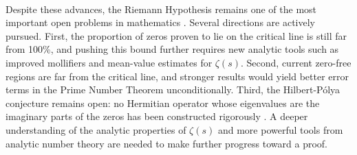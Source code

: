 \documentclass[10pt]{article}
\begin{document}
\paragraph{}
Despite these advances, the Riemann Hypothesis remains one of the most 
important open problems in mathematics \cite{carlson_millennium_2023}. 
Several directions are actively pursued. First, the proportion of zeros 
proven to lie on the critical line is still far from 100\%, and pushing 
this bound further requires new analytic tools such as improved mollifiers 
and mean-value estimates for $\zeta(s)$. Second, current zero-free regions 
are far from the critical line, and stronger results would yield better 
error terms in the Prime Number Theorem unconditionally. Third, the 
Hilbert-Pólya conjecture remains open: no Hermitian operator whose 
eigenvalues are the imaginary parts of the zeros has been constructed 
rigorously \cite{noauthor_riemann_nodate}. A deeper understanding of 
the analytic properties of $\zeta(s)$ \cite{gourdon_riemann_nodate} 
and more powerful tools from analytic number theory 
\cite{iwaniec_analytic_2021} are needed to make further progress 
toward a proof.



\end{document}
